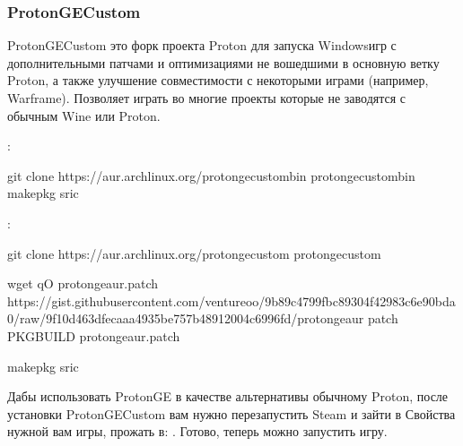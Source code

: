 \documentclass[letterpaper,10pt,russian,openany]{sphinxmanual}
\begin{document}
\ignorespaces 

\subsubsection{Proton\sphinxhyphen{}GE\sphinxhyphen{}Custom}
\label{\detokenize{source/linux-gaming:proton-ge-custom}}\label{\detokenize{source/linux-gaming:index-8}}\label{\detokenize{source/linux-gaming:id7}}
\sphinxAtStartPar
Proton\sphinxhyphen{}GE\sphinxhyphen{}Custom это форк проекта Proton для запуска Windows\sphinxhyphen{}игр с дополнительными патчами и оптимизациями не вошедшими в основную ветку Proton,
а также улучшение совместимости с некоторыми играми (например, Warframe).
Позволяет играть во многие проекты которые не заводятся с обычным Wine или Proton.

\sphinxAtStartPar
{}:

\begin{sphinxVerbatim}[commandchars=\\\{\}]
git clone https://aur.archlinux.org/proton\PYGZhy{}ge\PYGZhy{}custom\PYGZhy{}bin
 proton\PYGZhy{}ge\PYGZhy{}custom\PYGZhy{}bin
makepkg \PYGZhy{}sric
\end{sphinxVerbatim}

\sphinxAtStartPar
{}:

\begin{sphinxVerbatim}[commandchars=\\\{\}]
git clone https://aur.archlinux.org/proton\PYGZhy{}ge\PYGZhy{}custom
 proton\PYGZhy{}ge\PYGZhy{}custom

wget \PYGZhy{}qO proton\PYGZhy{}ge\PYGZhy{}aur.patch https://gist.githubusercontent.com/ventureoo/9b89c4799fbc89304f42983c6e90bda0/raw/9f10d463dfecaaa4935be757b48912004c6996fd/proton\PYGZhy{}ge\PYGZhy{}aur
patch PKGBUILD proton\PYGZhy{}ge\PYGZhy{}aur.patch

makepkg \PYGZhy{}sric
\end{sphinxVerbatim}

\sphinxAtStartPar
Дабы использовать Proton\sphinxhyphen{}GE в качестве альтернативы обычному Proton,
после установки Proton\sphinxhyphen{}GE\sphinxhyphen{}Custom вам нужно перезапустить Steam и зайти в Свойства нужной вам игры, прожать в:
. Готово, теперь можно запустить игру.
\end{document}

